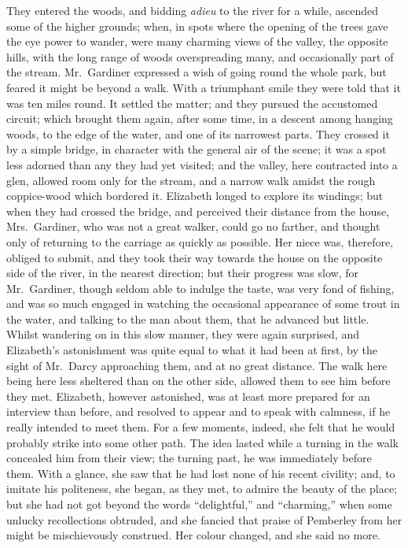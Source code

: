\documentclass[12pt,english,oneside]{book}
\begin{document}
They entered the woods, and bidding \emph{adieu} to the river for
a while, ascended some of the higher grounds; when, in spots where
the opening of the trees gave the eye power to wander, were many charming
views of the valley, the opposite hills, with the long range of woods
overspreading many, and occasionally part of the stream. Mr.\ Gardiner
expressed a wish of going round the whole park, but feared it might
be beyond a walk. With a triumphant smile they were told that it was
ten miles round. It settled the matter; and they pursued the accustomed
circuit; which brought them again, after some time, in a descent among
hanging woods, to the edge of the water, and one of its narrowest
parts. They crossed it by a simple bridge, in character with the general
air of the scene; it was a spot less adorned than any they had yet
visited; and the valley, here contracted into a glen, allowed room
only for the stream, and a narrow walk amidst the rough coppice-wood
which bordered it. Elizabeth longed to explore its windings; but when
they had crossed the bridge, and perceived their distance from the
house, Mrs.\ Gardiner, who was not a great walker, could go no farther,
and thought only of returning to the carriage as quickly as possible.
Her niece was, therefore, obliged to submit, and they took their way
towards the house on the opposite side of the river, in the nearest
direction; but their progress was slow, for Mr.\ Gardiner, though
seldom able to indulge the taste, was very fond of fishing, and was
so much engaged in watching the occasional appearance of some trout
in the water, and talking to the man about them, that he advanced
but little. Whilst wandering on in this slow manner, they were again
surprised, and Elizabeth's astonishment was quite equal to what it
had been at first, by the sight of Mr.\ Darcy approaching them, and
at no great distance. The walk here being here less sheltered than
on the other side, allowed them to see him before they met. Elizabeth,
however astonished, was at least more prepared for an interview than
before, and resolved to appear and to speak with calmness, if he really
intended to meet them. For a few moments, indeed, she felt that he
would probably strike into some other path. The idea lasted while
a turning in the walk concealed him from their view; the turning past,
he was immediately before them. With a glance, she saw that he had
lost none of his recent civility; and, to imitate his politeness,
she began, as they met, to admire the beauty of the place; but she
had not got beyond the words {}``delightful,'' and {}``charming,''
when some unlucky recollections obtruded, and she fancied that praise
of Pemberley from her might be mischievously construed. Her colour
changed, and she said no more.
\end{document}
